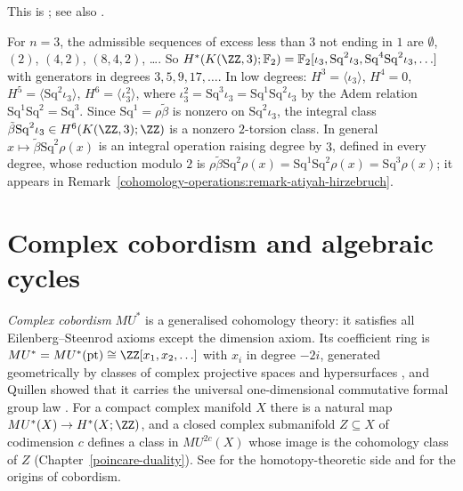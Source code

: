 This is \cite{serre-1953}; see also \cite{mosher-tangora}.

\begin{example}\label{cohomology-operations:example-k-z-3}
For $n = 3$, the admissible sequences of excess less than $3$ not ending in $1$ are $\emptyset$, $(2)$, $(4, 2)$, $(8, 4, 2)$, \ldots. So
$H^*(K(\ZZ, 3); \mathbb{F}_2) = \mathbb{F}_2[\iota_3, \mathrm{Sq}^2\iota_3, \mathrm{Sq}^4\mathrm{Sq}^2\iota_3, \ldots]$ with generators in degrees $3, 5, 9, 17, \ldots$. In low degrees:
$H^3 = \langle \iota_3 \rangle$, $H^4 = 0$, $H^5 = \langle \mathrm{Sq}^2\iota_3 \rangle$, $H^6 = \langle \iota_3^2 \rangle$, where $\iota_3^2 = \mathrm{Sq}^3\iota_3 = \mathrm{Sq}^1\mathrm{Sq}^2\iota_3$ by the Adem
relation $\mathrm{Sq}^1\mathrm{Sq}^2 = \mathrm{Sq}^3$. Since $\mathrm{Sq}^1 = \rho\tilde\beta$ is nonzero on $\mathrm{Sq}^2\iota_3$, the integral class $\tilde\beta\mathrm{Sq}^2\iota_3 \in H^6(K(\ZZ, 3); \ZZ)$ is a nonzero
$2$-torsion class. In general $x \mapsto \tilde\beta\mathrm{Sq}^2\rho(x)$ is an integral operation raising degree by $3$, defined in every degree, whose reduction modulo $2$ is
$\rho\tilde\beta\mathrm{Sq}^2\rho(x) = \mathrm{Sq}^1\mathrm{Sq}^2\rho(x) = \mathrm{Sq}^3\rho(x)$; it appears in Remark~\ref{cohomology-operations:remark-atiyah-hirzebruch}.
\end{example}

\section{Complex cobordism and algebraic cycles}\label{cohomology-operations:section-cobordism}

\begin{remark}\label{cohomology-operations:remark-cobordism}
\emph{Complex cobordism} $MU^*$ is a generalised cohomology theory: it satisfies all Eilenberg--Steenrod axioms except the dimension axiom. Its coefficient ring is
$MU^* = MU^*(\mathrm{pt}) \cong \ZZ[x_1, x_2, \ldots]$ with $x_i$ in degree $-2i$, generated geometrically by classes of complex projective spaces and hypersurfaces
\cite{stong-cobordism}, and Quillen showed that it carries the universal one-dimensional commutative formal group law \cite{quillen-1969}. For a compact complex manifold
$X$ there is a natural map $MU^*(X) \to H^*(X; \ZZ)$, and a closed complex submanifold $Z \subseteq X$ of codimension $c$ defines a class in $MU^{2c}(X)$ whose image is the cohomology class
of $Z$ (Chapter~\ref{poincare-duality}). See \cite{ravenel-green} for the homotopy-theoretic side and \cite{thom-1954} for the origins of cobordism.
\end{remark}

